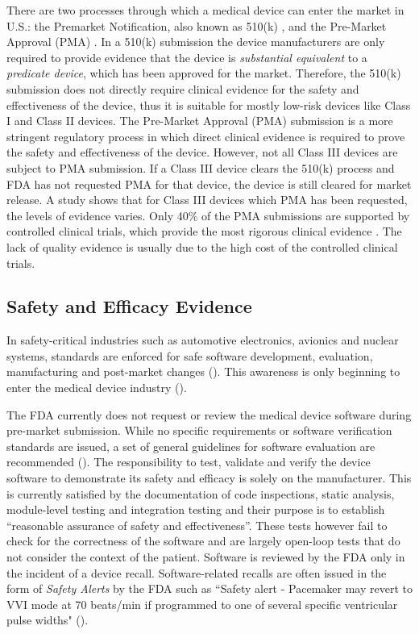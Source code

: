 There are two processes through which a medical device can enter the market in U.S.: the Premarket Notification, also known as 510(k) \cite{510k}, and the Pre-Market Approval (PMA) \cite{PMA}. In a 510(k) submission the device manufacturers are only required to provide evidence that the device is \emph{substantial equivalent} to a \emph{predicate device}, which has been approved for the market. Therefore, the 510(k) submission does not directly require clinical evidence for the safety and effectiveness of the device, thus it is suitable for mostly low-risk devices like Class I and Class II devices.  The Pre-Market Approval (PMA) submission is a more stringent regulatory process in which direct clinical evidence is required to prove the safety and effectiveness of the device. However, not all Class III devices are subject to PMA submission. If a Class III device clears the 510(k) process and FDA has not requested PMA for that device, the device is still cleared for market release. A study shows that for Class III devices which PMA has been requested, the levels of evidence varies. Only 40\% of the PMA submissions are supported by controlled clinical trials, which provide the most rigorous clinical evidence \cite{cert_prob}. The lack of quality evidence is usually due to the high cost of the controlled clinical trials.

\subsection{Safety and Efficacy Evidence}
In safety-critical industries such as automotive electronics, avionics and nuclear systems, standards are enforced for safe software development, evaluation, manufacturing and post-market changes (\cite{autosar,avsi}). This awareness is only beginning to enter the medical device industry (\cite{formal_fda}). 

The FDA currently does not request or review the medical device software during pre-market submission. While no specific requirements or software verification standards are issued, a set of general guidelines for software evaluation are recommended (\cite{fda1, fda2, fda3}). The responsibility to test, validate and verify the device software to demonstrate its safety and efficacy is solely on the manufacturer. This is currently satisfied by the documentation of code inspections, static analysis, module-level testing and integration testing and their purpose is to establish ``reasonable assurance of safety and effectiveness''. These tests however fail to check for the correctness of the software and are largely open-loop tests that do not consider the context of the patient. Software is reviewed by the FDA only in the incident of a device recall. Software-related recalls are often issued in the form of \emph{Safety Alerts} by the %
FDA such as ``Safety alert - Pacemaker may revert to VVI mode at 70 beats/min if programmed to one of several specific ventricular pulse widths" (\cite{medstats}).


